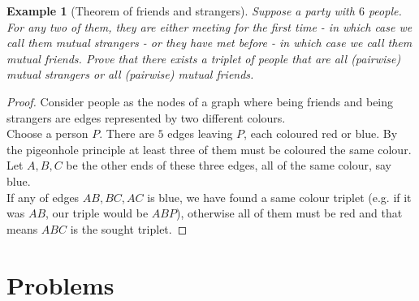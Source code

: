 \documentclass[11pt,a5paper]{article}
\newtheorem{theorem}{Example}
\begin{document}
\begin{theorem}[Theorem of friends and strangers]
Suppose a party with $6$ people. For any two of them, they are either meeting for the first time - in which case we call them mutual strangers - or they have met before - in which case we call them mutual friends. Prove that there exists a triplet of people that are all (pairwise) mutual strangers or all (pairwise) mutual friends.
\end{theorem}
\begin{proof}
Consider people as the nodes of a graph where being friends and being strangers are edges represented by two different colours.\\
Choose a person $P$. There are $5$ edges leaving $P$, each coloured red or blue. By the pigeonhole principle at least three of them must be coloured the same colour. Let $A,B,C$ be the other ends of these three edges, all of the same colour, say blue.\\

If any of edges $AB, BC, AC$ is blue, we have found a same colour triplet (e.g. if it was $AB$, our triple would be $ABP$), otherwise all of them must be red and that means $ABC$ is the sought triplet.\end{proof}

\section{Problems}
\end{document}
